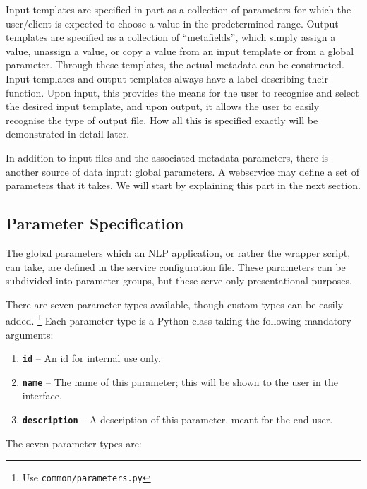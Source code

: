 \documentclass[a4paper,12pt,twoside,openright]{report}
\begin{document}
Input templates are specified in part as a collection of parameters for which
the user/client is expected to choose a value in the predetermined range.
Output templates are specified as a collection of ``metafields'', which simply
assign a value, unassign a value, or copy a value from an input template or from
a global parameter. Through these templates, the actual metadata can be
constructed. Input templates and output templates always have a label
describing their function. Upon input, this provides the means for the user to
recognise and select the desired input template, and upon output, it allows the
user to easily recognise the type of output file. How all this is specified
exactly will be demonstrated in detail later.

In addition to input files and the associated metadata parameters, there is
another source of data input: global parameters. A webservice may define a set
of parameters that it takes. We will start by explaining this part in the next
section.


\subsection{Parameter Specification}
\label{sec:parameters}

The global parameters which an NLP application, or rather the wrapper script,
can take, are defined in the service configuration file. These parameters can
be subdivided into parameter groups, but these serve only presentational
purposes. 

There are seven parameter types available, though custom types can be easily
added. \footnote{Use \texttt{common/parameters.py}} Each parameter type is a
Python class taking the following mandatory arguments:

\begin{enumerate}
\item \textbf{\texttt{id}} -- An id for internal use only.
\item \textbf{\texttt{name}} -- The name of this parameter; this will be shown to the user in the interface.
\item \textbf{\texttt{description}} -- A description of this parameter, meant for the end-user.
\end{enumerate}

The seven parameter types are:
\end{document}
